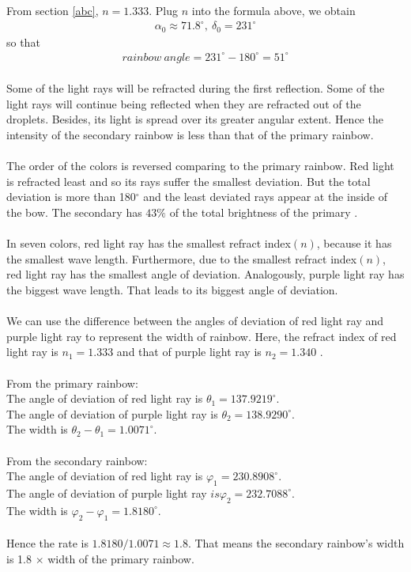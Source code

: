 \documentclass{article}
\begin{document}
\begin{spacing}{1.5}
From section \ref{abc}, $n= 1.333$. Plug $n$ into the formula above, we obtain \begin{align*}\alpha_0 \approx 71.8^{\circ},  \ \delta_0 = 231^{\circ}\end{align*} 
so that 
\begin{align*}rainbow\ angle=231^{\circ} -180^{\circ}=51^{\circ}\end{align*}
\\
Some of the light rays will be refracted during the first reflection. Some of the light rays will continue being reflected when they are refracted out of the droplets. Besides, its light is spread over its greater angular extent. \cite{Atoptics} Hence the intensity of the secondary rainbow is less than that of the primary rainbow.\\
\\
The order of the colors is reversed comparing to the primary rainbow. Red light is refracted least and so its rays suffer the smallest deviation. But the total deviation is more than 180$^{\circ}$ and the least deviated rays appear at the inside of the bow. The secondary has $43\%$ of the total brightness of the primary \cite{Atoptics}.\\
\\
In seven colors, red light ray has the smallest refract index$(n)$, because it has the smallest wave length. Furthermore, due to the smallest refract index$(n)$, red light ray has the smallest angle of deviation. Analogously, purple light ray has the biggest wave length. That leads to its biggest angle of deviation.\\
\\
We can use the difference between the angles of deviation of red light ray and purple light ray to represent the width of rainbow. Here, the refract index of red light ray is $n_{1}=1.333$ \cite{Optics} and that of purple light ray is $n_{2}=1.340$ \cite{1.340}.\\
\\
From the primary rainbow:\\
\indent \indent The angle of deviation of red light ray is $\theta_{1}=137.9219^{\circ}$.\\
\indent \indent The angle of deviation of purple light ray is $\theta_{2}=138.9290^{\circ}$.\\
\indent \indent The width is $\theta_{2}-\theta_{1}=1.0071^{\circ}$.\\
\\
From the secondary rainbow:\\
\indent \indent The angle of deviation of red light ray is $\varphi_{1}=230.8908^{\circ}$.\\
\indent \indent The angle of deviation of purple light ray $is \varphi_{2}=232.7088^{\circ}$.\\
\indent \indent The width is $\varphi_{2}-\varphi_{1}=1.8180^{\circ}$.\\
\\
Hence the rate is $1.8180/1.0071\approx1.8$. That means the secondary rainbow's width is 1.8 $\times$ width of the primary rainbow.

\end{spacing}
\end{document}
